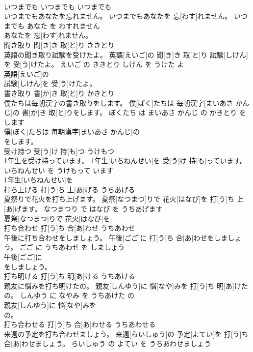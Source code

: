 \documentclass[8pt]{extreport}
\begin{document}
\begin{CJK}{UTF8}{min}
\\	いつまでも	いつまでも	いつまでも	
\\	いつまでもあなたを忘れません。	いつまでもあなたを 忘[わす]れません。	いつまでも あなた を わすれません	
\\	あなたを 忘[わす]れません。			
\\	聞き取り	聞[き]き 取[と]り	ききとり	
\\	英語の聞き取り試験を受けたよ。	英語[えいご]の 聞[き]き 取[と]り 試験[しけん]を 受[う]けたよ。	えいご の ききとり しけん を うけた よ	
\\	英語[えいご]の
\\	試験[しけん]を 受[う]けたよ。			
\\	書き取り	書[か]き 取[と]り	かきとり	
\\	僕たちは毎朝漢字の書き取りをします。	僕[ぼく]たちは 毎朝漢字[まいあさ かんじ]の 書[か]き 取[と]りをします。	ぼくたち は まいあさ かんじ の かきとり を します	
\\	僕[ぼく]たちは 毎朝漢字[まいあさ かんじ]の
\\	をします。			
\\	受け持つ	受[う]け 持[も]つ	うけもつ	
\\	1年生を受け持っています。	1年生[いちねんせい]を 受[う]け 持[も]っています。	いちねんせい を うけもって います	
\\	1年生[いちねんせい]を
\\	打ち上げる	打[う]ち 上[あ]げる	うちあげる	
\\	夏祭りで花火を打ち上げます。	夏祭[なつまつ]りで 花火[はなび]を 打[う]ち 上[あ]げます。	なつまつり で はなび を うちあげます	
\\	夏祭[なつまつ]りで 花火[はなび]を
\\	打ち合わせ	打[う]ち 合[あ]わせ	うちあわせ	
\\	午後に打ち合わせをしましょう。	午後[ごご]に 打[う]ち 合[あ]わせをしましょう。	ごご に うちあわせ を しましょう	
\\	午後[ごご]に
\\	をしましょう。			
\\	打ち明ける	打[う]ち 明[あ]ける	うちあける	
\\	親友に悩みを打ち明けたの。	親友[しんゆう]に 悩[なや]みを 打[う]ち 明[あ]けたの。	しんゆう に なやみ を うちあけた の	
\\	親友[しんゆう]に 悩[なや]みを
\\	の。			
\\	打ち合わせる	打[う]ち 合[あ]わせる	うちあわせる	
\\	来週の予定を打ち合わせましょう。	来週[らいしゅう]の 予定[よてい]を 打[う]ち 合[あ]わせましょう。	らいしゅう の よてい を うちあわせましょう	

\end{CJK}
\end{document}
